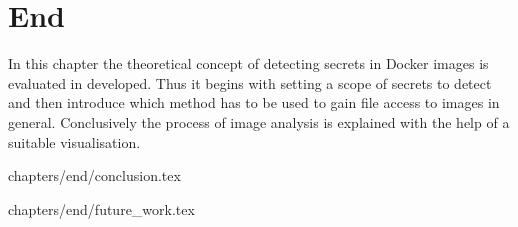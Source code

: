 \chapter{End}
\label{ch:end}
In this chapter the theoretical concept of detecting secrets in Docker images is evaluated in developed. Thus it begins with setting a scope of secrets to detect and then introduce which method has to be used to gain file access to images in general. Conclusively the process of image analysis is explained with the help of a suitable visualisation.

 {chapters/end/conclusion.tex}

 {chapters/end/future_work.tex}

